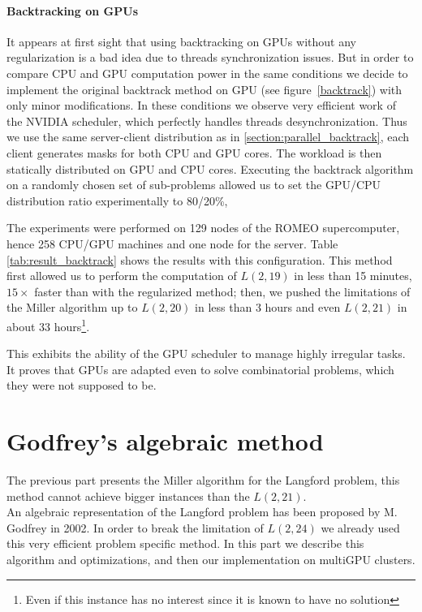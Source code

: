 \paragraph{Backtracking on GPUs}

It appears at first sight that using backtracking on GPUs without any regularization is a bad idea due to threads synchronization issues.
But in order to compare CPU and GPU computation power in the same conditions we decide to implement the original backtrack method on GPU (see figure~\ref{backtrack}) with only minor modifications.
In these conditions we observe very efficient work of the NVIDIA scheduler, which perfectly handles threads desynchronization.
Thus we use the same server-client distribution as in \ref{section:parallel_backtrack}, each client generates masks for both CPU and GPU cores. 
The workload is then statically distributed on GPU and CPU cores.
Executing the backtrack algorithm on a randomly chosen set of sub-problems allowed us to set the GPU/CPU distribution ratio experimentally to 80/20\%, 

The experiments were performed on 129 nodes of the ROMEO supercomputer, hence 258 CPU/GPU machines and one node for the server. 
Table \ref{tab:result_backtrack} shows the results with this configuration. 
This method first allowed us to perform the computation of $L(2,19)$ in less than 15 minutes, $15\times$ faster than with the regularized method; then, we pushed the limitations of the Miller algorithm up to $L(2,20)$ in less than 3 hours and even $L(2,21)$ in about $33$ hours\footnote{Even if this instance has no interest since it is known to have no solution}.

This exhibits the ability of the GPU scheduler to manage highly irregular tasks. It proves that GPUs are adapted even to solve combinatorial problems, which they were not supposed to be.

\section{Godfrey's algebraic method}
The previous part presents the Miller algorithm for the Langford problem, this method cannot achieve bigger instances than the $L(2,21)$.\\
An algebraic representation of the Langford problem has been proposed by M. Godfrey in 2002.
In order to break the limitation of $L(2,24)$ we already used this very efficient problem specific method.
In this part we describe this algorithm and optimizations, and then our implementation on multiGPU clusters.
